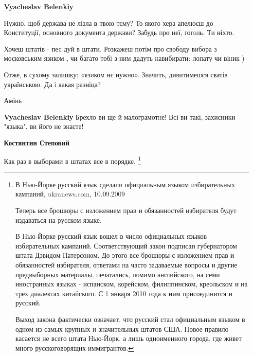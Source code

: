 \begin{itemize}
\begin{itemize}
\textbf{Vyacheslav Belenkiy} 

Нужно, щоб держава не лізла в твою тєму? То якого хера апелюєш до Конституції,
основного документа держави? Забудь про неї, гоголь. Ти ніхто.

Хочеш штатів - пес дуй в штати. Розкажеш потім про свободу вибора з московським
язиком , чи багато тобі з ним дадуть навибирати: лопату чи віник )

Отже, в сухому залишку: «язиком нє нужно». Значить, дивитимешся сватів
українською. Да і какая разніца?

Амінь

 
\textbf{Vyacheslav Belenkiy} Брехло ви ще й малограмотне! Всі ви такі, захисники "языка", ви його не знаєте!

 
\textbf{Костянтин Степовий}


Как раз в выборами в штатах все в порядке.
\footnote{
В Нью-Йорке русский язык сделали официальным языком избирательных кампаний, ukranews.com, 10.09.2009\par

Теперь все брошюры с изложением прав и обязанностей избирателя будут издаваться на русском языке.

В Нью-Йорке русский язык вошел в число официальных языков избирательных
кампаний. Соответствующий закон подписан губернатором штата Дэвидом Патерсоном.
До этого все брошюры с изложением прав и обязанностей избирателя, ответами на
часто задаваемые вопросы и другие предвыборных материалы, печатались, помимо
английского, на семи иностранных языках - испанском, корейском, филиппинском,
креольском и на трех диалектах китайского. С 1 января 2010 года к ним
присоединится и русский.

Выход закона фактически означает, что русский стал официальным языком в одном
из самых крупных и значительных штатов США. Новое правило касается не всего
штата Нью-Йорк, а лишь одноименного города, где живет много русскоговорящих
иммигрантов.

}
\end{itemize}
\end{itemize}
